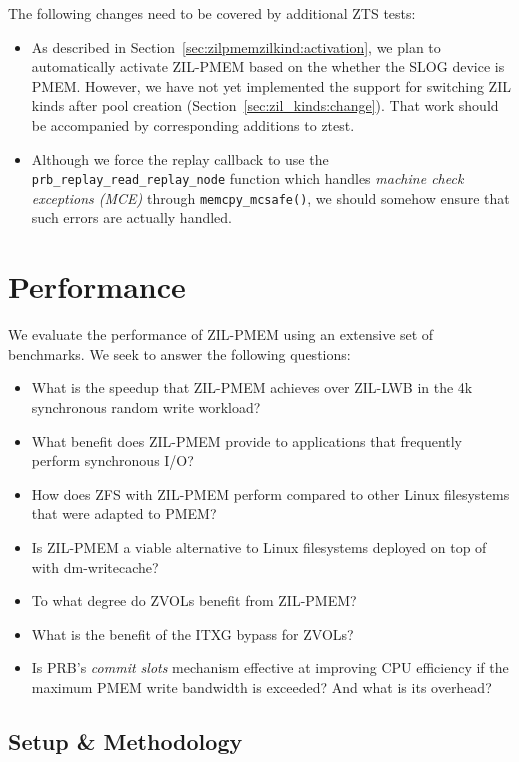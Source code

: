 \documentclass[12pt,a4paper,twoside]{book}
\begin{document}
The following changes need to be covered by additional ZTS tests:
\begin{itemize}
    \item As described in Section~\ref{sec:zilpmemzilkind:activation}, we plan to automatically activate ZIL-PMEM based on the whether the SLOG device is PMEM.
        However, we have not yet implemented the support for switching ZIL kinds after pool creation (Section~\ref{sec:zil_kinds:change}).
        That work should be accompanied by corresponding additions to ztest.
    \item Although we force the replay callback to use the \lstinline{prb_replay_read_replay_node} function which handles \textit{machine check exceptions (MCE)} through \lstinline{memcpy_mcsafe()}, we should somehow ensure that such errors are actually handled.
\end{itemize}

\section{Performance}
We evaluate the performance of ZIL-PMEM using an extensive set of benchmarks.
We seek to answer the following questions:
\begin{itemize}[noitemsep]
    \item What is the speedup that ZIL-PMEM achieves over ZIL-LWB in the 4k synchronous random write workload?
    \item What benefit does ZIL-PMEM provide to applications that frequently perform synchronous I/O?
    \item How does ZFS with ZIL-PMEM perform compared to other Linux filesystems that were adapted to PMEM?
    \item Is ZIL-PMEM a viable alternative to Linux filesystems deployed on top of with dm-writecache?
    \item To what degree do ZVOLs benefit from ZIL-PMEM?
    \item What is the benefit of the ITXG bypass for ZVOLs?
    \item Is PRB's \textit{commit slots} mechanism effective at improving CPU efficiency if the maximum PMEM write bandwidth is exceeded? And what is its overhead?
\end{itemize}

\subsection{Setup \& Methodology}
\end{document}
